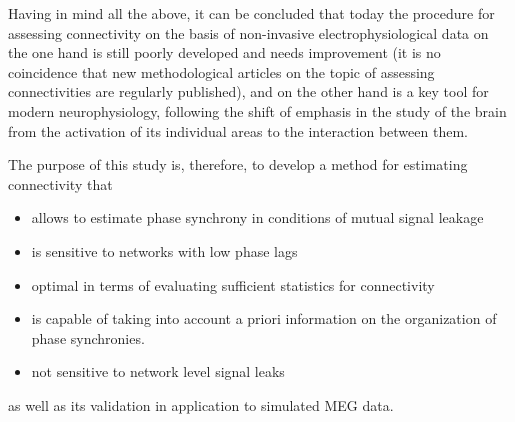 

Having in mind all the above, it can be concluded that today the procedure for
assessing connectivity on the basis of non-invasive electrophysiological data
on the one hand is still poorly developed and needs improvement (it is no
coincidence that new methodological articles on the topic of assessing
connectivities are regularly published), and on the other hand is a key tool
for modern neurophysiology, following the shift of emphasis in the study of the
brain from the activation of its individual areas to the interaction between
them.

{\aim} 
The purpose of this study is, therefore, to develop a method for estimating connectivity that

\begin{itemize}
        \item allows to estimate phase synchrony in conditions of mutual signal leakage
        \item is sensitive to networks with low phase lags
        \item optimal in terms of evaluating sufficient statistics for connectivity
        \item is capable of taking into account a priori information on the organization of phase synchronies.
        \item not sensitive to network level signal leaks
\end{itemize}
as well as its validation in application to simulated MEG data.

